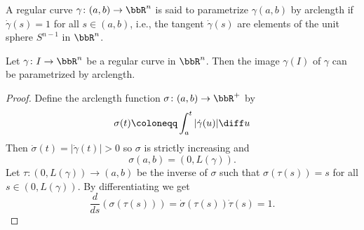 \begin{definition}
A regular curve $\gamma\colon(a,b)\to\bbR^n$ is said to parametrize
$\gamma(a,b)$ by arclength if $\dot\gamma(s)=1$ for all $s\in(a,b)$, i.e.,
the tangent $\dot\gamma(s)$ are elements of the unit sphere $S^{n-1}$ in
$\bbR^n$.
\end{definition}

\begin{theorem}
Let $\gamma\colon I\to\bbR^n$ be a regular curve in $\bbR^n$. Then the
image $\gamma(I)$ of $\gamma$ can be parametrized by arclength.
\end{theorem}

\begin{proof}
Define the arclength function $\sigma\colon (a,b)\to\bbR^+$ by
\[
\sigma(t)\coloneqq\int_a^t|\dot\gamma(u)|\diff u
\]
Then $\dot\sigma(t)=|\dot\gamma(t)|>0$ so $\sigma$ is strictly increasing
and
\[
\sigma(a,b)=(0,L(\gamma)).
\]
Let $\tau\colon(0,L(\gamma))\to(a,b)$ be the inverse of $\sigma$ such that
$\sigma(\tau(s))=s$ for all $s\in(0,L(\gamma))$. By differentiating we get
\[
\frac{d}{ds}(\sigma(\tau(s)))=\dot\sigma(\tau(s))\dot\tau(s)=1.
\]
\end{proof}

